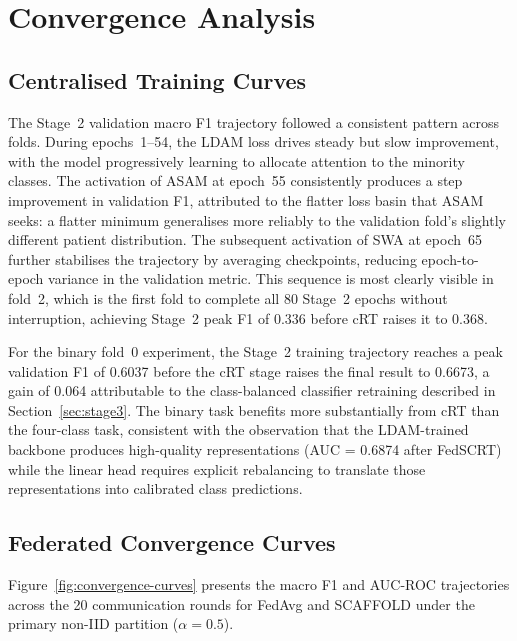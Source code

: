 \section{Convergence Analysis}
\label{sec:convergence-results}

\subsection{Centralised Training Curves}
\label{sec:centralised-convergence}

The Stage~2 validation macro F1 trajectory followed a
consistent pattern across folds.
During epochs~1--54, the LDAM loss drives steady but slow
improvement, with the model progressively learning to
allocate attention to the minority classes.
The activation of ASAM at epoch~55 consistently produces
a step improvement in validation F1, attributed to the
flatter loss basin that ASAM seeks: a flatter minimum
generalises more reliably to the validation fold's
slightly different patient distribution.
The subsequent activation of SWA at epoch~65 further
stabilises the trajectory by averaging checkpoints,
reducing epoch-to-epoch variance in the validation metric.
This sequence is most clearly visible in fold~2, which
is the first fold to complete all 80 Stage~2 epochs
without interruption, achieving Stage~2 peak F1 of $0.336$
before cRT raises it to $0.368$.

For the binary fold~0 experiment, the Stage~2 training
trajectory reaches a peak validation F1 of 0.6037 before
the cRT stage raises the final result to 0.6673,
a gain of 0.064 attributable to the class-balanced
classifier retraining described in
Section~\ref{sec:stage3}.
The binary task benefits more substantially from cRT
than the four-class task, consistent with the observation
that the LDAM-trained backbone produces high-quality
representations (AUC = 0.6874 after FedSCRT) while the
linear head requires explicit rebalancing to translate
those representations into calibrated class predictions.

\subsection{Federated Convergence Curves}
\label{sec:federated-convergence}

Figure~\ref{fig:convergence-curves} presents the
macro F1 and AUC-ROC trajectories across the 20
communication rounds for FedAvg and SCAFFOLD under
the primary non-IID partition ($\alpha=0.5$).

